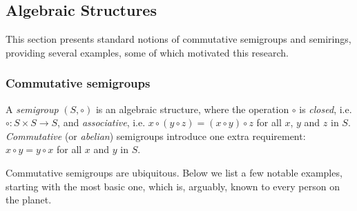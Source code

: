 \subsection{Algebraic Structures}\label{subsec:algstr}

This section presents standard notions of commutative semigroups and semirings,
providing several examples, some of which motivated this research.

\subsubsection{Commutative semigroups}

A \emph{semigroup} $(S, \circ)$ is an algebraic structure, where the operation
$\circ$ is \emph{closed}, i.e. $\circ : S\times S \rightarrow S$, and
\emph{associative}, i.e.
$x \circ (y \circ z) = (x \circ y) \circ z$ for all $x$, $y$ and $z$ in $S$.
\emph{Commutative} (or \emph{abelian}) semigroups introduce one extra
requirement: $x \circ y = y \circ x$ for all $x$ and $y$ in $S$.

Commutative semigroups are ubiquitous. Below we list a few
notable examples, starting with the most basic one, which is, arguably, known
to every person on the planet.

